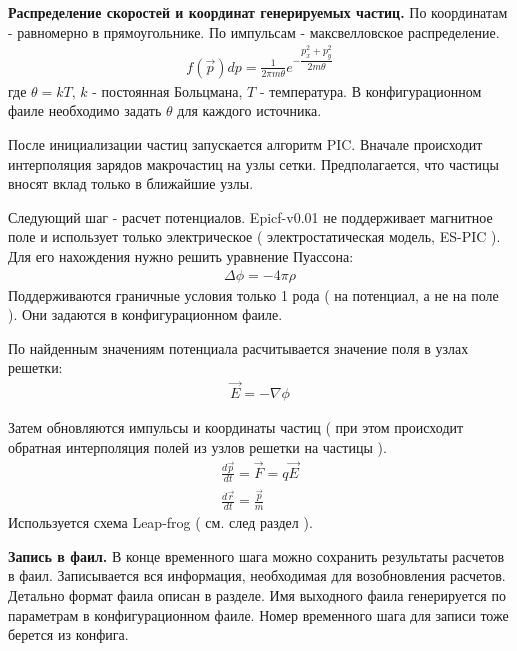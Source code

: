 \textbf{Распределение скоростей и координат генерируемых частиц.}
По координатам - равномерно в прямоугольнике.
По импульсам - максвелловское распределение.
\begin{gather}
  f( \vec{p} ) dp = \frac{1}{ 2 \pi m \theta } e^{ - \dfrac{ p_x^2 + p_y^2 }{ 2 m \theta } }
\end{gather}
где $\theta = k T$, $k$ - постоянная Больцмана, $T$ - температура.
В конфигурационном фаиле необходимо задать $\theta$ для каждого источника.


После инициализации частиц запускается алгоритм PIC. 
Вначале происходит интерполяция зарядов макрочастиц на узлы сетки.
Предполагается, что частицы вносят вклад только в ближайшие узлы. 


Следующий шаг - расчет потенциалов. 
Epicf-v0.01 не поддерживает магнитное поле
и использует только электрическое ( электростатическая модель, ES-PIC ).
Для его нахождения нужно решить уравнение Пуассона:
\begin{gather}
  \Delta \phi = - 4 \pi \rho
\end{gather}
Поддерживаются граничные условия только 1 рода ( на потенциал, а не на поле ).
Они задаются в конфигурационном фаиле.

По найденным значениям потенциала расчитывается значение поля в узлах решетки:
\begin{gather}
  \vec{ E } = - \nabla \phi
\end{gather}

Затем обновляются импульсы и координаты частиц
( при этом происходит обратная интерполяция полей из узлов решетки на частицы ).
\begin{gather}
  \frac{ d \vec{p} }{ d t } = \vec{ F } = q \vec{ E }
  \\
  \frac{ d \vec{r} }{ d t } = \frac{ \vec{p} }{ m }
\end{gather}
Используется схема Leap-frog ( см. след раздел ).

\textbf{Запись в фаил.}
В конце временного шага можно сохранить результаты расчетов в фаил. 
Записывается вся информация, необходимая для возобновления расчетов.
Детально формат фаила описан в  разделе. 
Имя выходного фаила генерируется по параметрам в конфигурационном фаиле.
Номер временного шага для записи тоже берется из конфига.




